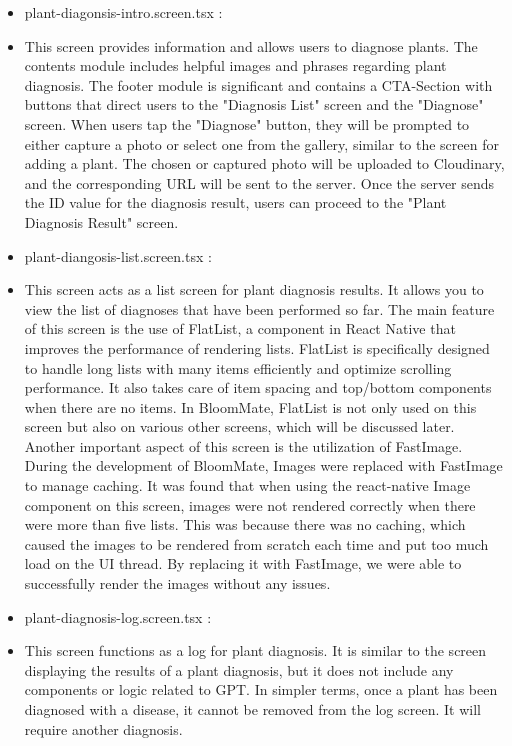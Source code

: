 \documentclass[conference, a4paper]{IEEEtran}
\begin{document}
\begin{enumerate}
\begin{enumerate}
\begin{itemize}
        \item plant-diagonsis-intro.screen.tsx : 
        \item[] This screen provides information and allows users to diagnose plants. The contents module includes helpful images and phrases regarding plant diagnosis. The footer module is significant and contains a CTA-Section with buttons that direct users to the "Diagnosis List" screen and the "Diagnose" screen. When users tap the "Diagnose" button, they will be prompted to either capture a photo or select one from the gallery, similar to the screen for adding a plant. The chosen or captured photo will be uploaded to Cloudinary, and the corresponding URL will be sent to the server. Once the server sends the ID value for the diagnosis result, users can proceed to the "Plant Diagnosis Result" screen. \\

        \item plant-diangosis-list.screen.tsx : 
        \item[] This screen acts as a list screen for plant diagnosis results. It allows you to view the list of diagnoses that have been performed so far. The main feature of this screen is the use of FlatList, a component in React Native that improves the performance of rendering lists. FlatList is specifically designed to handle long lists with many items efficiently and optimize scrolling performance. It also takes care of item spacing and top/bottom components when there are no items. In BloomMate, FlatList is not only used on this screen but also on various other screens, which will be discussed later. Another important aspect of this screen is the utilization of FastImage. During the development of BloomMate, Images were replaced with FastImage to manage caching. It was found that when using the react-native Image component on this screen, images were not rendered correctly when there were more than five lists. This was because there was no caching, which caused the images to be rendered from scratch each time and put too much load on the UI thread. By replacing it with FastImage, we were able to successfully render the images without any issues. \\

        \item plant-diagnosis-log.screen.tsx : 
        \item[] This screen functions as a log for plant diagnosis. It is similar to the screen displaying the results of a plant diagnosis, but it does not include any components or logic related to GPT. In simpler terms, once a plant has been diagnosed with a disease, it cannot be removed from the log screen. It will require another diagnosis.\\


\end{itemize}
\end{enumerate}
\end{enumerate}
\end{document}

